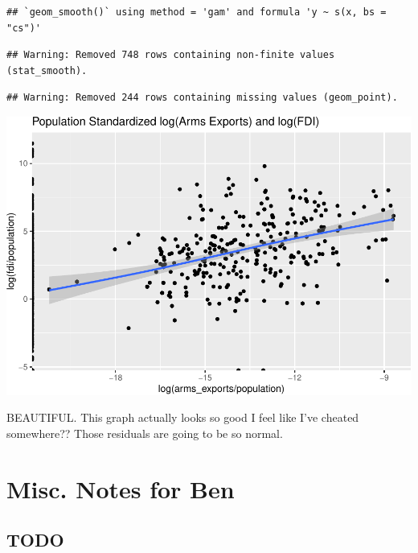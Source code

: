 \documentclass[12pt,]{article}
\begin{document}
\begin{verbatim}
## `geom_smooth()` using method = 'gam' and formula 'y ~ s(x, bs = "cs")'
\end{verbatim}

\begin{verbatim}
## Warning: Removed 748 rows containing non-finite values (stat_smooth).
\end{verbatim}

\begin{verbatim}
## Warning: Removed 244 rows containing missing values (geom_point).
\end{verbatim}

\includegraphics{proposal_files/figure-latex/unnamed-chunk-21-1.pdf}

BEAUTIFUL. This graph actually looks so good I feel like I've cheated
somewhere?? Those residuals are going to be so normal.

\hypertarget{misc.-notes-for-ben}{%
\section{Misc. Notes for Ben}\label{misc.-notes-for-ben}}

\hypertarget{todo}{%
\subsection{TODO}\label{todo}}
\end{document}
